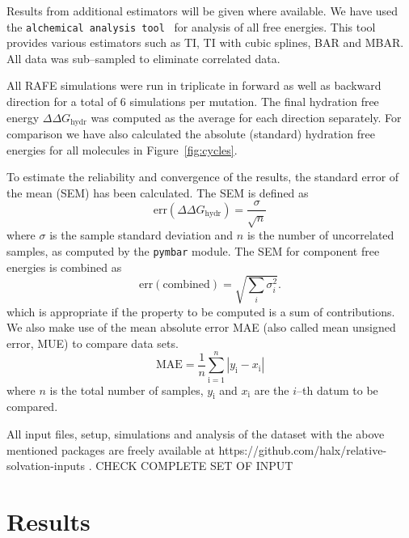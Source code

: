 \documentclass[journal=jctcce,manuscript=article]{achemso}
\newcommand{\progname}[1]{\texttt{#1}}
\begin{document}
Results from additional estimators will be given where available.  We have used
the \progname{alchemical analysis
  tool}~\cite{klimovich_guidelines_2015} for analysis of
all free energies.  This tool provides various estimators such as TI, TI with
cubic splines, BAR and MBAR.  All data was sub--sampled to eliminate correlated
data.

All RAFE simulations were run in triplicate in forward as well as
backward direction for a total of 6 simulations per mutation.  The
final hydration free energy $\Delta\Delta G_{\mathrm{hydr}}$ was
computed as the average for each direction separately.  For comparison we have also calculated the absolute (standard) hydration free energies for all molecules in Figure~\ref{fig:cycles}.

To estimate the reliability and convergence of the results, the
standard error of the mean (SEM) has been calculated.  The SEM is
defined as
\begin{equation}
  \label{eq:sem}
  \mathrm{err}(\Delta\Delta G_{\mathrm{hydr}}) = \frac{\sigma}{\sqrt{n}}
\end{equation}
where $\sigma$ is the sample standard deviation and $n$ is the number of uncorrelated samples, as computed by the \texttt{pymbar} module.
  The SEM for component free energies is combined as
\begin{equation}
  \label{eq:sem-comb}
  \mathrm{err}(\mathrm{combined}) = \sqrt{\sum_i \sigma_i^2}.
\end{equation}
which is appropriate if the property to be computed is a sum of
contributions.
We also make use of the mean absolute error MAE (also called mean unsigned
error, MUE) to compare data sets.
\begin{equation}
\label{eq:MUE}
\mathrm{MAE} = \frac{1}{n}\sum_\mathrm{i=1}^n \left | y_\mathrm{i} -
x_\mathrm{i} \right |
\end{equation}
where $n$ is the total number of samples, $y_\mathrm{i}$ and $x_\mathrm{i}$ are
the $i$--th datum to be compared.

All input files, setup, simulations and analysis of the dataset with the above mentioned packages are freely available at
https://github.com/halx/relative-solvation-inputs .
{\color{red} CHECK COMPLETE SET OF INPUT}


\section{Results}
\label{sec:results}
\end{document}
